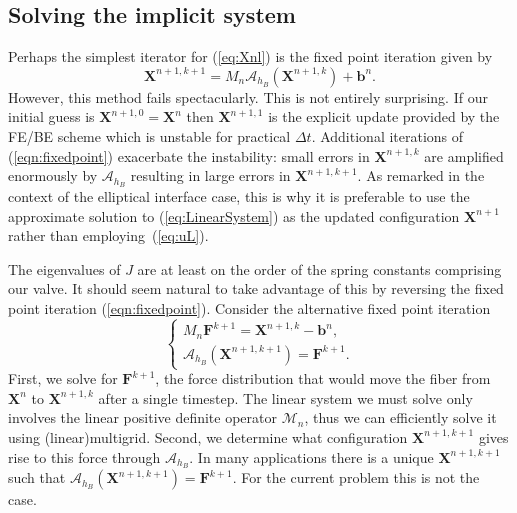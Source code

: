 \documentclass[preprint,12pt]{elsarticle}
\begin{document}
\subsection{Solving the implicit system}
Perhaps the simplest iterator for (\ref{eq:Xnl}) is the fixed point iteration given by
\begin{equation}
\mathbf{X}^{n+1,k+1} = \mathit{M}_n\mathcal{A}_{h_B} (\mathbf{X}^{n+1,k}) + \mathbf{b}^n.
\label{eqn:fixedpoint}
\end{equation}
However, this method fails spectacularly. This is not entirely surprising.
 If our initial guess is $\mathbf{X}^{n+1,0}=\mathbf{X}^n$ then $\mathbf{X}^{n+1,1}$ is the explicit update provided by the FE/BE scheme which is unstable for practical $\Delta t$. Additional iterations of (\ref{eqn:fixedpoint}) exacerbate the instability: small errors in $\mathbf{X}^{n+1,k}$ are amplified enormously by $\mathcal{A}_{h_B}$ resulting in large errors in $\mathbf{X}^{n+1,k+1}$.  As 
 remarked in the context of the elliptical interface case, this is why it is preferable to use the approximate solution to (\ref{eq:LinearSystem}) as the updated configuration $\mathbf{X}^{n+1}$ rather than employing~(\ref{eq:uL}). 

The eigenvalues of $J$ are at least on the order of the spring constants comprising our valve. It should seem natural to take advantage of this by reversing the fixed point iteration (\ref{eqn:fixedpoint}). Consider the alternative fixed point iteration
\begin{equation}
\left\{
\begin{gathered}
\mathit{M}_n\mathbf{F}^{k+1} = \mathbf{X}^{n+1,k} - \mathbf{b}^n,\\
\mathcal{A}_{h_B}(\mathbf{X}^{n+1,k+1}) = \mathbf{F}^{k+1}.
\end{gathered}
\right.
\label{eqn:fixedpoint2}
\end{equation}
First, we solve for $\mathbf{F}^{k+1}$, the force distribution that would move the fiber from $\mathbf{X}^n$ to $\mathbf{X}^{n+1,k}$ after a single timestep. The linear system we must solve only involves the linear positive definite operator $\mathcal{M}_n$, thus we can efficiently solve it using (linear)multigrid. Second, we determine what configuration $\mathbf{X}^{n+1,k+1}$ gives rise to this force through $\mathcal{A}_{h_B}$.
In many applications there is a unique $\mathbf{X}^{n+1,k+1}$ such that
$\mathcal{A}_{h_B}(\mathbf{X}^{n+1,k+1}) = \mathbf{F}^{k+1}$. For the current problem this is not the case.
\end{document}
